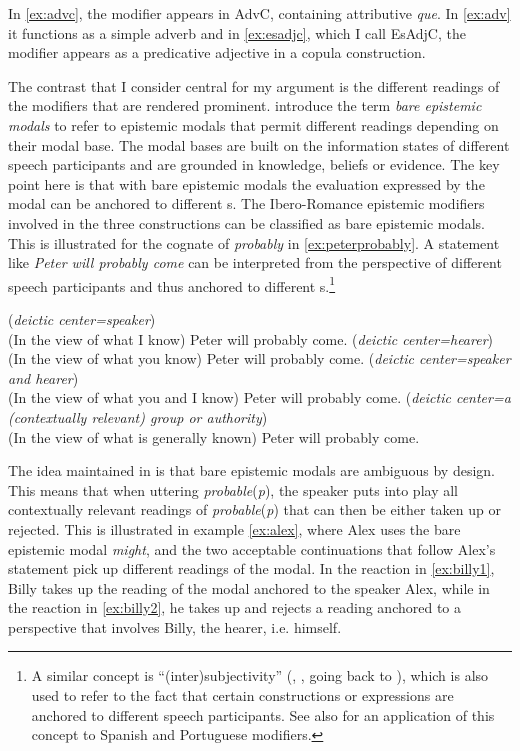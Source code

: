 In \eqref{ex:advc}, the modifier appears in AdvC, containing attributive \emph{que}. In \eqref{ex:adv} it functions as a simple adverb and in \eqref{ex:esadjc}, which I call EsAdjC, the modifier appears as a predicative adjective in a copula construction.

The contrast that I consider central for my argument is the different readings of the modifiers that are rendered prominent.  introduce the term \emph{bare epistemic modals} to refer to epistemic modals that permit  different readings depending on their modal base. The modal bases are built  on the information states  of different speech participants and are grounded in  knowledge, beliefs or evidence. The key point here is that with bare epistemic modals the  evaluation expressed by the modal can be anchored to different s. The  Ibero-Romance epistemic modifiers involved in the three constructions can be classified as bare epistemic modals. This is illustrated for the cognate of \emph{probably} in \eqref{ex:peterprobably}. A statement like \emph{Peter will probably come} can be interpreted  from the perspective of different speech participants and thus  anchored to different s.\footnote{A similar concept is ``(inter)subjectivity'' (\citealt{Nuyts2001}, \citealt{Traugott2010}, going back to \citealt{Lyons1977}), which is also  used to refer to the fact that certain constructions or expressions are anchored to different speech participants. See also \citet{Kocher2018} for an application of this concept to Spanish and Portuguese modifiers.}

\ea \label{ex:peterprobably}
\ea (\textit{deictic center=speaker})\\
    (In the view of what I know) Peter will probably come.
\ex (\textit{deictic center=hearer})\\
	(In the view of what you know) Peter will {probably} come.
\ex\label{ex:probyouandI}(\textit{deictic center=speaker and hearer})\\
	(In the view of what you and I know) Peter will {probably} come.
\ex\label{ex:probgeneral}(\textit{deictic center=a (contextually relevant) group or authority})\\
	(In the view of what is generally known) Peter will {probably} come.
\z
\z

The idea maintained in \citet{Fintel2011} is that bare epistemic modals are ambiguous by design. This means that when uttering \textit{probable}(\textit{p}), the speaker puts into play all contextually relevant readings of \textit{probable}(\textit{p}) that can then be either taken up or rejected. This is illustrated in example \eqref{ex:alex}, where Alex uses the bare epistemic modal \emph{might}, and the two acceptable continuations that follow Alex's statement pick up different readings of the modal. In the reaction in \eqref{ex:billy1}, Billy takes up the reading of the modal anchored to the speaker Alex, while in the reaction in \eqref{ex:billy2}, he takes up and rejects a reading anchored to a perspective that involves Billy, the hearer, i.e. himself. 


